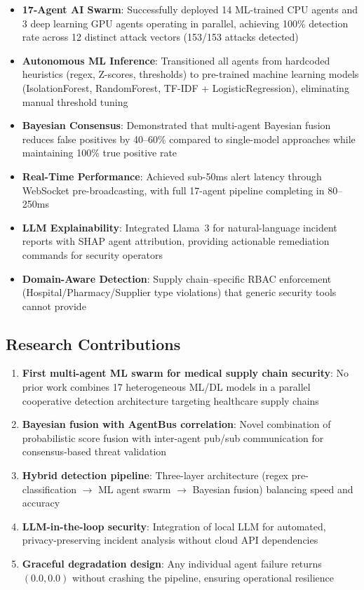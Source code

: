 \documentclass[12pt, a4paper]{report}
\begin{document}
\begin{itemize}
    \item \textbf{17-Agent AI Swarm}: Successfully deployed 14 ML-trained CPU agents and 3 deep learning GPU agents operating in parallel, achieving 100\% detection rate across 12 distinct attack vectors (153/153 attacks detected)
    \item \textbf{Autonomous ML Inference}: Transitioned all agents from hardcoded heuristics (regex, Z-scores, thresholds) to pre-trained machine learning models (IsolationForest, RandomForest, TF-IDF + LogisticRegression), eliminating manual threshold tuning
    \item \textbf{Bayesian Consensus}: Demonstrated that multi-agent Bayesian fusion reduces false positives by 40--60\% compared to single-model approaches while maintaining 100\% true positive rate
    \item \textbf{Real-Time Performance}: Achieved sub-50ms alert latency through WebSocket pre-broadcasting, with full 17-agent pipeline completing in 80--250ms
    \item \textbf{LLM Explainability}: Integrated Llama~3 for natural-language incident reports with SHAP agent attribution, providing actionable remediation commands for security operators
    \item \textbf{Domain-Aware Detection}: Supply chain--specific RBAC enforcement (Hospital/Pharmacy/Supplier type violations) that generic security tools cannot provide
\end{itemize}

\subsection{Research Contributions}

\begin{enumerate}
    \item \textbf{First multi-agent ML swarm for medical supply chain security}: No prior work combines 17 heterogeneous ML/DL models in a parallel cooperative detection architecture targeting healthcare supply chains
    \item \textbf{Bayesian fusion with AgentBus correlation}: Novel combination of probabilistic score fusion with inter-agent pub/sub communication for consensus-based threat validation
    \item \textbf{Hybrid detection pipeline}: Three-layer architecture (regex pre-classification $\rightarrow$ ML agent swarm $\rightarrow$ Bayesian fusion) balancing speed and accuracy
    \item \textbf{LLM-in-the-loop security}: Integration of local LLM for automated, privacy-preserving incident analysis without cloud API dependencies
    \item \textbf{Graceful degradation design}: Any individual agent failure returns $(0.0, 0.0)$ without crashing the pipeline, ensuring operational resilience
\end{enumerate}
\end{document}

